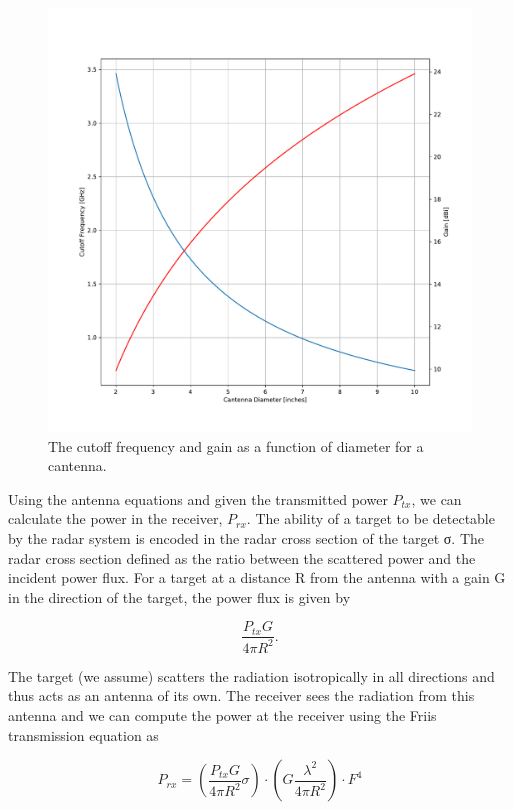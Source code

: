 \documentclass[reprint, aps, prl]{revtex4-1}
\begin{document}
\begin{figure}[!htbp]
    \centering
    \includegraphics[scale=0.35]{cantenna.pdf}
    \caption{The cutoff frequency and gain as a function of diameter for a cantenna.}
    \label{fig:cutoffgain}
\end{figure}

Using the antenna equations and given the transmitted power $P_{tx}$, we can calculate the power in the receiver, $P_{rx}$. The ability of a target to be detectable by the radar system is encoded in the radar cross section of the target σ. The radar cross section defined as the ratio between the scattered power and the incident power flux. For a target at a distance R from the antenna with a gain G in the direction of the target, the power flux is given by 

\begin{equation}
\frac{P_{tx} G}{4 \pi R^2}.
\end{equation}

The target (we assume) scatters the radiation isotropically in all directions and thus acts as an antenna of its own. The receiver sees the radiation from this antenna and we can compute the power at the receiver using the Friis transmission equation as 

\begin{equation}
P_{rx} = \left(\frac{P_{tx} G}{4 \pi R^2} \sigma \right) \cdot \left(G \frac{\lambda^2}{4 \pi R^2} \right) \cdot F^4
\end{equation}
\end{document}
